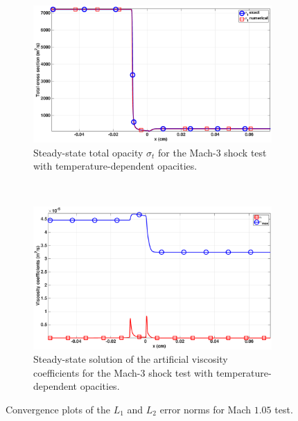 \documentclass[times,doublespace]{fldauth}%
\begin{document}
\begin{figure}[H]
    \begin{subfigure}{0.5\textwidth}
    \centering
    \includegraphics[width=\linewidth]{figures/dpt-xs/mach_3_nel_1000_total_cross_section.eps}
    \caption{Steady-state total opacity $\sigma_t$ for the Mach-3 shock test with temperature-dependent opacities.}\label{fig:mach-3-dpt-xs-xs}
    \end{subfigure}
    ~
    \begin{subfigure}{0.5\textwidth}
    \centering
    \includegraphics[width=\linewidth]{figures/dpt-xs/mach_3_nel_1000_viscosity.eps}
    \caption{Steady-state solution of the artificial viscosity coefficients for the Mach-3 shock test with temperature-dependent opacities.}\label{fig:mach-3-dpt-xs-visc}
    \end{subfigure}        
\caption{Convergence plots of the $L_1$ and $L_2$ error norms for Mach $1.05$ test.}\label{fig:mach-3-temp-dep-xs}    
\end{figure}
%
\end{document}
